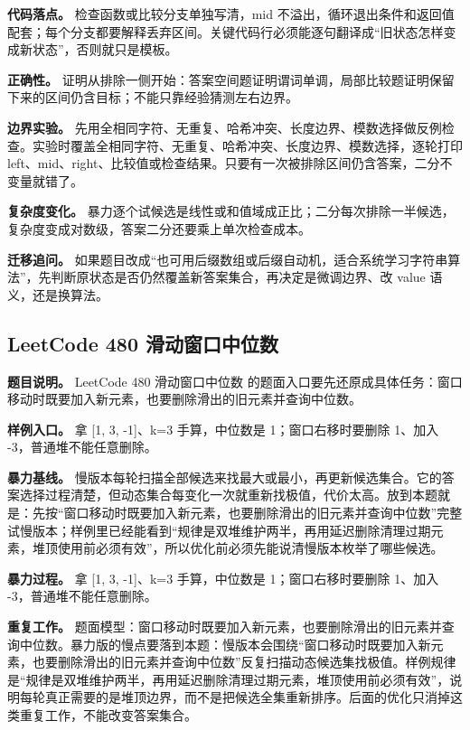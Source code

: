 \textbf{代码落点。} 检查函数或比较分支单独写清，mid 不溢出，循环退出条件和返回值配套；每个分支都要解释丢弃区间。关键代码行必须能逐句翻译成“旧状态怎样变成新状态”，否则就只是模板。

\textbf{正确性。} 证明从排除一侧开始：答案空间题证明谓词单调，局部比较题证明保留下来的区间仍含目标；不能只靠经验猜测左右边界。

\textbf{边界实验。} 先用全相同字符、无重复、哈希冲突、长度边界、模数选择做反例检查。实验时覆盖全相同字符、无重复、哈希冲突、长度边界、模数选择，逐轮打印 left、mid、right、比较值或检查结果。只要有一次被排除区间仍含答案，二分不变量就错了。

\textbf{复杂度变化。} 暴力逐个试候选是线性或和值域成正比；二分每次排除一半候选，复杂度变成对数级，答案二分还要乘上单次检查成本。

\textbf{迁移追问。} 如果题目改成“也可用后缀数组或后缀自动机，适合系统学习字符串算法”，先判断原状态是否仍然覆盖新答案集合，再决定是微调边界、改 value 语义，还是换算法。

\subsection{LeetCode 480 滑动窗口中位数}

\textbf{题目说明。} LeetCode 480 滑动窗口中位数 的题面入口要先还原成具体任务：窗口移动时既要加入新元素，也要删除滑出的旧元素并查询中位数。

\textbf{样例入口。} 拿 [1, 3, -1]、k=3 手算，中位数是 1；窗口右移时要删除 1、加入 -3，普通堆不能任意删除。

\textbf{暴力基线。} 慢版本每轮扫描全部候选来找最大或最小，再更新候选集合。它的答案选择过程清楚，但动态集合每变化一次就重新找极值，代价太高。放到本题就是：先按“窗口移动时既要加入新元素，也要删除滑出的旧元素并查询中位数”完整试慢版本；样例里已经能看到“规律是双堆维护两半，再用延迟删除清理过期元素，堆顶使用前必须有效”，所以优化前必须先能说清慢版本枚举了哪些候选。

\textbf{暴力过程。} 拿 [1, 3, -1]、k=3 手算，中位数是 1；窗口右移时要删除 1、加入 -3，普通堆不能任意删除。

\textbf{重复工作。} 题面模型：窗口移动时既要加入新元素，也要删除滑出的旧元素并查询中位数。暴力版的慢点要落到本题：慢版本会围绕“窗口移动时既要加入新元素，也要删除滑出的旧元素并查询中位数”反复扫描动态候选集找极值。样例规律是“规律是双堆维护两半，再用延迟删除清理过期元素，堆顶使用前必须有效”，说明每轮真正需要的是堆顶边界，而不是把候选全集重新排序。后面的优化只消掉这类重复工作，不能改变答案集合。

